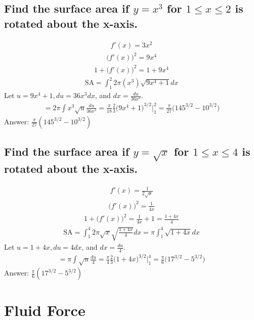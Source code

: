 \documentclass{article}
\begin{document}
\subsection{Find the surface area if $y = x^3$ for $1 \leq x \leq 2$ is rotated about the x-axis.}
\begin{align*}
	f'(x) = 3x^2
\end{align*}
\begin{align*}
	\bigg( f'(x) \bigg)^2 = 9x^4
\end{align*}
\begin{align*}
	1 + \bigg( f'(x) \bigg)^2 = 1 + 9x^4
\end{align*}
\begin{align*}
	\text{SA} = \int_1^2 {2\pi (x^3) \sqrt{9x^4 + 1}dx}
\end{align*}
Let $u = 9x^4 + 1, du = 36x^3dx$, and $dx = \frac{du}{36x^3}$. 
\begin{align*}
	= 2\pi \int{x^3 \sqrt{u} \frac{du}{36x^3}} = \frac{\pi}{18} \frac{2}{3} \bigg( 9x^4 + 1 \bigg)^{3/2} \bigg|_1^2 = \frac{\pi}{27} \bigg( 145^{3/2} - 10^{3/2} \bigg)
\end{align*}
Answer: $\frac{\pi}{27} (145^{3/2} - 10^{3/2})$

\subsection{Find the surface area if $y = \sqrt{x}$ for $1 \leq x \leq 4$ is rotated about the x-axis.}
\begin{align*}
	f'(x) = \frac{1}{2\sqrt{x}}
\end{align*}
\begin{align*}
	\bigg( f'(x) \bigg)^2 = \frac{1}{4x}
\end{align*}
\begin{align*}
	1 + \bigg( f'(x) \bigg)^2 = \frac{1}{4x}  + 1 = \frac{1 + 4x}{4}
\end{align*}
\begin{align*}
	\text{SA} = \int_1^4 {2\pi \sqrt{x} \sqrt{\frac{1 + 4x}{4}}dx} = \pi \int_1^4{\sqrt{1 + 4x}dx}
\end{align*}
Let $u = 1 + 4x, du = 4dx$, and $dx = \frac{du}{4}$.  
\begin{align*}
	= \pi \int {\sqrt{u} \frac{du}{4}} = \frac{\pi}{4} \frac{2}{3} \bigg( 1 + 4x \bigg)^{3/2} \bigg|_1^4 = \frac{\pi}{6} \bigg( 17^{3/2} - 5^{3/2} \bigg)
\end{align*}
Answer: $\frac{\pi}{6} (17^{3/2} - 5^{3/2})$

\section{Fluid Force}
\end{document}
